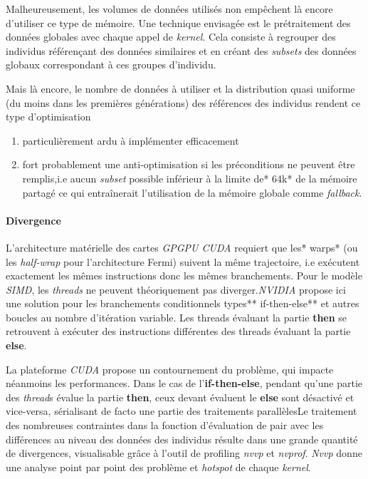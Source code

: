 \documentclass[french, 11pt]{memoir}
\begin{document}
Malheureusement, les volumes de données utilisés non empêchent là encore
d'utiliser ce type de mémoire. Une technique envisagée est le
prétraitement des données globales avec chaque appel de \emph{kernel}.
Cela consiste à regrouper des individus référençant des données
similaires et en créant des \emph{subsets} des données globaux
correspondant à ces groupes d'individu.

Mais là encore, le nombre de données à utiliser et la distribution quasi
uniforme (du moins dans les premières générations) des références des
individus rendent ce type d'optimisation

\begin{enumerate}
	\def\labelenumi{\arabic{enumi})}
	\item
	particulièrement ardu à implémenter efficacement
	\item
	fort probablement une anti-optimisation si les préconditions ne
	peuvent être remplis,i.e aucun \emph{subset }possible inférieur à la
	limite de* 64k* de la mémoire partagé ce qui entraînerait
	l'utilisation de la mémoire globale comme \emph{fallback}.
\end{enumerate}

\paragraph{Divergence}\label{divergence}

L'architecture matérielle des cartes \emph{GPGPU CUDA }requiert que les*
warps* (ou les \emph{half-wrap} pour l'architecture Fermi) suivent la
même trajectoire, i.e exécutent exactement les mêmes instructions donc
les mêmes branchements. Pour le modèle \emph{SIMD}, les \emph{threads}
ne peuvent théoriquement pas diverger.\emph{NVIDIA} propose ici une
solution pour les branchements conditionnels types** if-then-else** et
autres boucles au nombre d'itération variable. Les threads évaluant la
partie \textbf{then} se retrouvent à exécuter des instructions
différentes des threads évaluant la partie \textbf{else}.

La plateforme \emph{CUDA} propose un contournement du problème, qui
impacte néanmoins les performances. Dans le cas de
l'\textbf{if-then-else}, pendant qu'une partie des \emph{thread}s évalue
la partie \textbf{then}, ceux devant évaluent le \textbf{else} sont
désactivé et vice-versa, sérialisant de facto une partie des traitements
parallèlesLe traitement des nombreuses contraintes dans la fonction
d'évaluation de pair avec les différences au niveau des données des
individus résulte dans une grande quantité de divergences, visualisable
grâce à l'outil de profiling \emph{nvvp} et \emph{nvprof}. \emph{Nvvp}
donne une analyse point par point des problème et \emph{hotspot} de
chaque \emph{kernel}.
\end{document}
